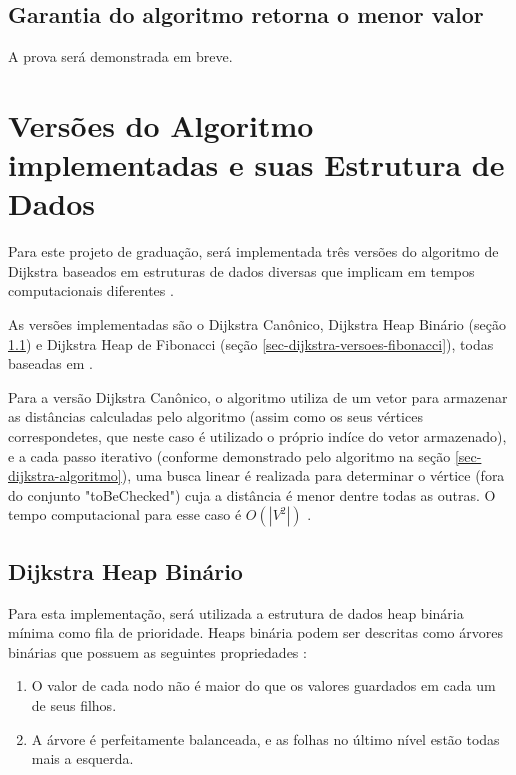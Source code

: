 \subsection{Garantia do algoritmo retorna o menor valor}
\label{sec-dijkstra-algoritmo-prova}
A prova será demonstrada em breve.

\section{Versões do Algoritmo implementadas e suas Estrutura de Dados}
\label{sec-dijkstra-versoes}
Para este projeto de graduação, será implementada três versões do algoritmo de Dijkstra baseados em estruturas de dados diversas que implicam em tempos computacionais diferentes \cite{cormen2009introduction}.

As versões implementadas são o Dijkstra Canônico, Dijkstra Heap Binário (seção \ref{sec-dijkstra-versoes-heap}) e Dijkstra Heap de Fibonacci (seção \ref{sec-dijkstra-versoes-fibonacci}), todas baseadas em .

Para a versão Dijkstra Canônico, o algoritmo utiliza de um vetor para armazenar as distâncias calculadas pelo algoritmo (assim como os seus vértices correspondetes, que neste caso é utilizado o próprio indíce do vetor armazenado), e a cada passo iterativo (conforme demonstrado pelo algoritmo na seção \ref{sec-dijkstra-algoritmo}), uma busca linear é realizada para determinar o vértice (fora do conjunto "toBeChecked") cuja a distância é menor dentre todas as outras. O tempo computacional para esse caso é $O(|V^{2}|)$ \cite{drozdek2012data}.

\subsection{Dijkstra Heap Binário}
\label{sec-dijkstra-versoes-heap}
Para esta implementação, será utilizada a estrutura de dados heap binária mínima como fila de prioridade. Heaps binária podem ser descritas como árvores binárias que possuem as seguintes propriedades \cite{drozdek2012data}:
\begin{enumerate}
 \item O valor de cada nodo não é maior do que os valores guardados em cada um de seus filhos.
 \item A árvore é perfeitamente balanceada, e as folhas no último nível estão todas mais a esquerda.
\end{enumerate}

